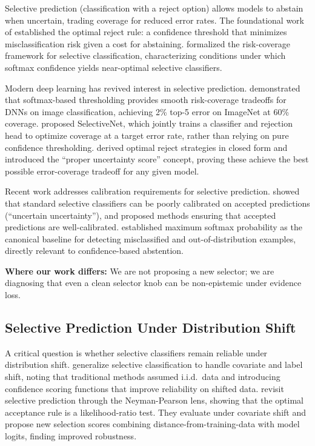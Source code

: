 \documentclass{article}
\begin{document}
Selective prediction (classification with a reject option) allows models to abstain when uncertain, trading coverage for reduced error rates. The foundational work of \citet{chow1970optimum} established the optimal reject rule: a confidence threshold that minimizes misclassification risk given a cost for abstaining. \citet{el2010foundations} formalized the risk-coverage framework for selective classification, characterizing conditions under which softmax confidence yields near-optimal selective classifiers.

Modern deep learning has revived interest in selective prediction. \citet{geifman2017selective} demonstrated that softmax-based thresholding provides smooth risk-coverage tradeoffs for DNNs on image classification, achieving 2\% top-5 error on ImageNet at 60\% coverage. \citet{geifman2019selectivenet} proposed SelectiveNet, which jointly trains a classifier and rejection head to optimize coverage at a target error rate, rather than relying on pure confidence thresholding. \citet{franc2023optimal} derived optimal reject strategies in closed form and introduced the ``proper uncertainty score'' concept, proving these achieve the best possible error-coverage tradeoff for any given model.

Recent work addresses calibration requirements for selective prediction. \citet{fisch2022calibrated} showed that standard selective classifiers can be poorly calibrated on accepted predictions (``uncertain uncertainty''), and proposed methods ensuring that accepted predictions are well-calibrated. \citet{hendrycks2017baseline} established maximum softmax probability as the canonical baseline for detecting misclassified and out-of-distribution examples, directly relevant to confidence-based abstention.

\textbf{Where our work differs:} We are not proposing a new selector; we are diagnosing that even a clean selector knob can be non-epistemic under evidence loss.

\subsection{Selective Prediction Under Distribution Shift}

A critical question is whether selective classifiers remain reliable under distribution shift. \citet{liang2024selective} generalize selective classification to handle covariate and label shift, noting that traditional methods assumed i.i.d.\ data and introducing confidence scoring functions that improve reliability on shifted data. \citet{heng2025knowabstainoptimalselective} revisit selective prediction through the Neyman-Pearson lens, showing that the optimal acceptance rule is a likelihood-ratio test. They evaluate under covariate shift and propose new selection scores combining distance-from-training-data with model logits, finding improved robustness.
\end{document}
